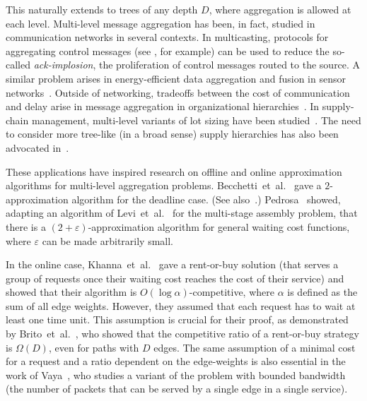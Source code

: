 \documentclass[a4paper]{article}
\newcommand{\etal}{et~al.}
\newcommand{\eps}{{\varepsilon}}
\begin{document}
This naturally
extends to trees of any depth $D$, where aggregation is allowed at each level.
Multi-level message aggregation has been, in fact, studied in 
communication networks in several contexts. In multicasting, protocols for aggregating
control messages (see \cite{bortnikov_cohen_infocom_98,badrinath_sudame_gathercast_00}, for example)
can be used to reduce the so-called \emph{ack-implosion}, the
proliferation of control messages routed to the source.
A similar problem arises in energy-efficient data aggregation and fusion in
sensor networks~\cite{hu_cao_may_sensors_05,yuan_et_al_data_fusion_03}.
Outside of networking, tradeoffs between the cost of communication and delay arise in
message aggregation in organizational hierarchies~\cite{Papadimitriou_96}.
In supply-chain management, multi-level variants of lot sizing have been
studied~\cite{wallance_et_al_multistage_assembly_73,kims_multilevel_lot_sizing_97}.
The need to consider more tree-like (in a broad sense) supply hierarchies
has also been advocated in~\cite{Lambert_Cooper_issues_chain_management_00}.

These applications have inspired research on offline and online
approximation algorithms for multi-level aggregation problems.
Becchetti~{\etal}~\cite{packet-aggregation-becchetti} gave a $2$-approximation
algorithm for the deadline case. (See also~\cite{aggregation-bkv}.)
Pedrosa~\cite{lehilton-note} showed, adapting an algorithm of
Levi~{\etal}~\cite{jrp-levi-2-approx} for the multi-stage assembly problem,
that there is a $(2+\eps)$-approximation algorithm for general waiting cost functions, 
where $\eps$ can be made arbitrarily small.

In the online case,
Khanna~{\etal}~\cite{khanna-message-aggregation} gave a rent-or-buy solution
(that serves a group of requests once their waiting cost reaches the cost
of their service) and showed that their algorithm is $O(\log \alpha)$-competitive,
where $\alpha$ is defined as the sum of all edge weights. 
However, they assumed that
each request has to wait at least one time unit. This assumption is crucial for their
proof, as demonstrated by Brito~{\etal}~\cite{aggregation-bkv}, who showed that
the competitive ratio of a rent-or-buy strategy is $\Omega(D)$, even
for paths with $D$ edges. 
The same assumption of a minimal cost for a request and a ratio dependent
on the edge-weights is also essential in the work of
Vaya~\cite{Vaya_delay_deliver_12}, who studies a variant of the
problem with bounded bandwidth (the number of packets that can be
served by a single edge in a single service).
\end{document}
